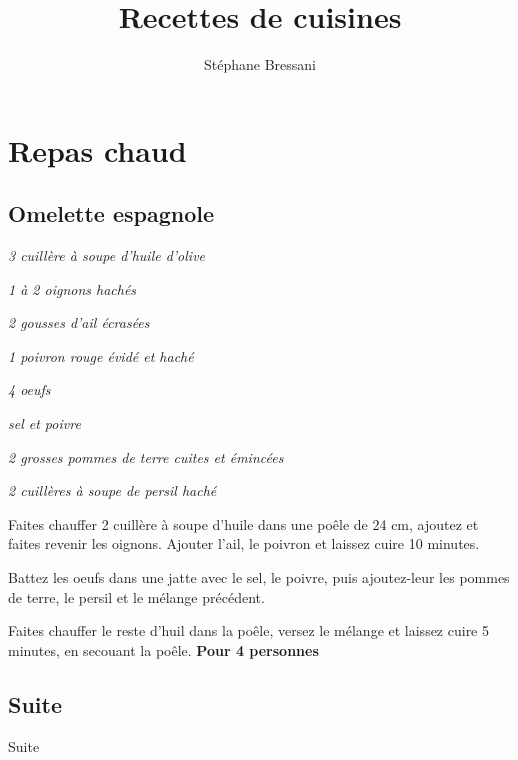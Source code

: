 \documentclass[10pt,a4paper]{recettes}
\author{Stéphane Bressani}
\title{Recettes de cuisines}
\begin{document}
    \maketitle
    \tableofcontents

    \chapter{Repas chaud}
    \section{Omelette espagnole}

    \begin{multicols}{2}
        \parbox[1cm]{\textwidth}{
            \begin{ingredients}
                \item \textit{3 cuillère à soupe d'huile d'olive}
                \item \textit{1 à 2 oignons hachés}
                \item \textit{2 gousses d'ail écrasées}
                \item \textit{1 poivron rouge évidé et haché}
                \item \textit{4 oeufs}
                \item \textit{sel et poivre}
                \item \textit{2 grosses pommes de terre cuites et émincées}
                \item \textit{2 cuillères à soupe de persil haché}
            \end{ingredients}
        }
        \columnbreak

        Faites chauffer 2 cuillère à soupe d'huile dans une poêle de 24 cm, ajoutez et faites revenir les oignons. Ajouter l'ail, le poivron et laissez cuire 10 minutes.
        \newline

        Battez les oeufs dans une jatte avec le sel, le poivre, puis ajoutez-leur les pommes de terre, le persil et le mélange précédent.
        \newline

        Faites chauffer le reste d'huil dans la poêle, versez le mélange et laissez cuire 5 minutes, en secouant la poêle.
        \newline
        \newline
        \textbf{Pour 4 personnes}
    \end{multicols}
    \section{Suite}
    Suite
\end{document}
